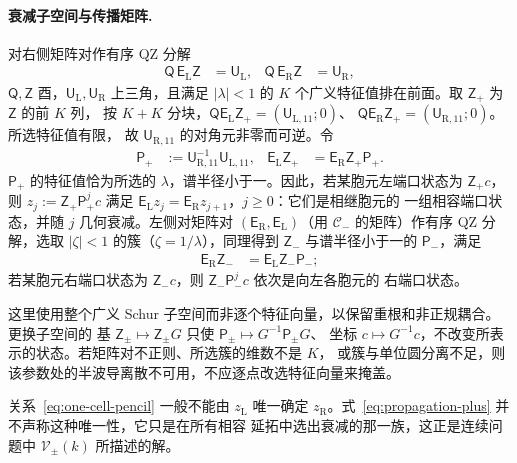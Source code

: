 \paragraph{衰减子空间与传播矩阵.}
对右侧矩阵对作有序 QZ 分解
\begin{align*}
  \mathsf Q\,\mathsf E_{\mathrm L}\mathsf Z&=\mathsf U_{\mathrm L},
  &\mathsf Q\,\mathsf E_{\mathrm R}\mathsf Z&=\mathsf U_{\mathrm R},
\end{align*}
$\mathsf Q,\mathsf Z$ 酉，$\mathsf U_{\mathrm L},\mathsf U_{\mathrm R}$ 上三角，且满足
$|\lambda|<1$ 的 $K$ 个广义特征值排在前面。取 $\mathsf Z_+$ 为 $\mathsf Z$ 的前 $K$ 列，
按 $K+K$ 分块，$\mathsf Q\mathsf E_{\mathrm L}\mathsf Z_+=(\mathsf U_{\mathrm L,11};0)$、
$\mathsf Q\mathsf E_{\mathrm R}\mathsf Z_+=(\mathsf U_{\mathrm R,11};0)$。所选特征值有限，
故 $\mathsf U_{\mathrm R,11}$ 的对角元非零而可逆。令
\begin{align}
  \mathsf P_+&:=\mathsf U_{\mathrm R,11}^{-1}\mathsf U_{\mathrm L,11},
  &\mathsf E_{\mathrm L}\mathsf Z_+&=\mathsf E_{\mathrm R}\mathsf Z_+\mathsf P_+.
  \label{eq:propagation-plus}
\end{align}
$\mathsf P_+$ 的特征值恰为所选的 $\lambda$，谱半径小于一。因此，若某胞元左端口状态为
$\mathsf Z_+c$，则 $z_j:=\mathsf Z_+\mathsf P_+^jc$ 满足
$\mathsf E_{\mathrm L}z_j=\mathsf E_{\mathrm R}z_{j+1}$，$j\geq0$：它们是相继胞元的
一组相容端口状态，并随 $j$ 几何衰减。左侧对矩阵对
$(\mathsf E_{\mathrm R},\mathsf E_{\mathrm L})$（用 $\mathcal C_-$ 的矩阵）作有序 QZ
分解，选取 $|\zeta|<1$ 的簇（$\zeta=1/\lambda$），同理得到 $\mathsf Z_-$ 与谱半径小于一的
$\mathsf P_-$，满足
\begin{align}
  \mathsf E_{\mathrm R}\mathsf Z_-&=\mathsf E_{\mathrm L}\mathsf Z_-\mathsf P_-;
  \label{eq:propagation-minus}
\end{align}
若某胞元右端口状态为 $\mathsf Z_-c$，则 $\mathsf Z_-\mathsf P_-^jc$ 依次是向左各胞元的
右端口状态。

这里使用整个广义 Schur 子空间而非逐个特征向量，以保留重根和非正规耦合。更换子空间的
基 $\mathsf Z_\pm\mapsto\mathsf Z_\pm G$ 只使 $\mathsf P_\pm\mapsto G^{-1}\mathsf P_\pm G$、
坐标 $c\mapsto G^{-1}c$，不改变所表示的状态。若矩阵对不正则、所选簇的维数不是 $K$，
或簇与单位圆分离不足，则该参数处的半波导离散不可用，不应逐点改选特征向量来掩盖。

关系~\eqref{eq:one-cell-pencil} 一般不能由 $z_{\mathrm L}$ 唯一确定
$z_{\mathrm R}$。式~\eqref{eq:propagation-plus} 并不声称这种唯一性，它只是在所有相容
延拓中选出衰减的那一族，这正是连续问题中 $\mathcal V_\pm(k)$ 所描述的解。

